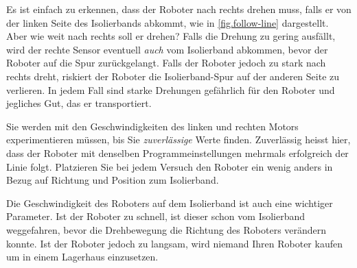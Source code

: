 

Es ist einfach zu erkennen, dass der Roboter nach rechts drehen muss, falls er von der linken Seite des Isolierbands abkommt, wie in \cref{fig.follow-line} dargestellt. Aber wie weit nach rechts soll er drehen? Falls die Drehung zu gering ausfällt, wird der rechte Sensor eventuell \emph{auch} vom Isolierband abkommen, bevor der Roboter auf die Spur zurückgelangt. Falls der Roboter jedoch zu stark nach rechts dreht, riskiert der Roboter die Isolierband-Spur auf der anderen Seite zu verlieren. In jedem Fall sind starke Drehungen gefährlich für den Roboter und jegliches Gut, das er transportiert.

Sie werden mit den Geschwindigkeiten des linken und rechten Motors experimentieren müssen, bis Sie \emph{zuverlässige} Werte finden. Zuverlässig heisst hier, dass der Roboter mit denselben Programmeinstellungen mehrmals erfolgreich der Linie folgt. Platzieren Sie bei jedem Versuch den Roboter ein wenig anders in Bezug auf Richtung und Position zum Isolierband.

Die Geschwindigkeit des Roboters auf dem Isolierband ist auch eine wichtiger Parameter. Ist der Roboter zu schnell, ist dieser schon vom Isolierband weggefahren, bevor die Drehbewegung die Richtung des Roboters verändern konnte. Ist der Roboter jedoch zu langsam, wird niemand Ihren Roboter kaufen um in einem Lagerhaus einzusetzen.


\bigskip


